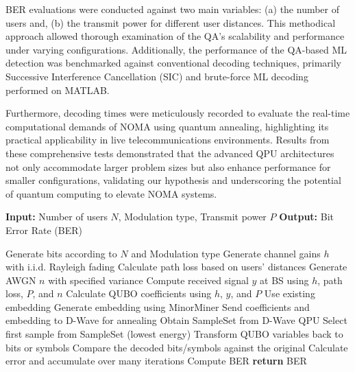 BER evaluations were conducted against two main variables: (a) the number of users and, (b) the transmit power for different user distances. This methodical approach allowed thorough examination of the QA's scalability and performance under varying configurations. Additionally, the performance of the QA-based ML detection was benchmarked against conventional decoding techniques, primarily Successive Interference Cancellation (SIC) and brute-force ML decoding performed on MATLAB.

Furthermore, decoding times were meticulously recorded to evaluate the real-time computational demands of NOMA using quantum annealing, highlighting its practical applicability in live telecommunications environments. Results from these comprehensive tests demonstrated that the advanced QPU architectures not only accommodate larger problem sizes but also enhance performance for smaller configurations, validating our hypothesis and underscoring the potential of quantum computing to elevate NOMA systems.

\begin{algorithm}
\caption{Simulation of NOMA on Quantum Annealer \label{algorithm}  }
\begin{algorithmic}[1]
\State \textbf{Input:} Number of users $N$, Modulation type, Transmit power $P$
\State \textbf{Output:} Bit Error Rate (BER)

    \State Generate bits according to $N$ and Modulation type
    \State Generate channel gains $h$ with i.i.d. Rayleigh fading
    \State Calculate path loss based on users' distances
    \State Generate AWGN $n$ with specified variance
    \State Compute received signal $y$ at BS using $h$, path loss, $P$, and $n$
    \State Calculate QUBO coefficients using $h$, $y$, and $P$
        \State Use existing embedding
    \Else
        \State Generate embedding using MinorMiner
    \EndIf
    \State Send coefficients and embedding to D-Wave for annealing
    \State Obtain SampleSet from D-Wave QPU
    \State Select first sample from SampleSet (lowest energy)
    \State Transform QUBO variables back to bits or symbols
    \State Compare the decoded bits/symbols against the original
    \State Calculate error and accumulate over many iterations
    \State Compute BER
    \State \textbf{return} BER
\EndProcedure
\end{algorithmic}
\end{algorithm}




